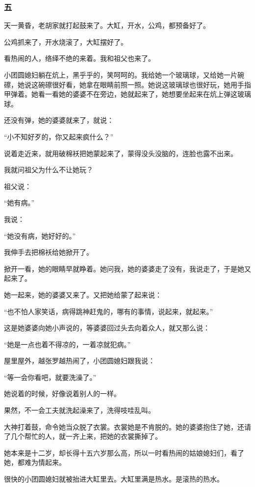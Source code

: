 \subsubsection*{五}
\par 天一黄昏，老胡家就打起鼓来了。大缸，开水，公鸡，都预备好了。
\par 公鸡抓来了，开水烧滚了，大缸摆好了。
\par 看热闹的人，络绎不绝的来着。我和祖父也来了。
\par 小团圆媳妇躺在炕上，黑乎乎的，笑呵呵的。我给她一个玻璃球，又给她一片碗䃰，她说这碗䃰很好看，她拿在眼睛前照一照。她说这玻璃球也很好玩，她用手指甲弹着。她看一看她的婆婆不在旁边，她就起来了，她想要坐起来在炕上弹这玻璃球。
\par 还没有弹，她的婆婆就来了，就说：
\par “小不知好歹的，你又起来疯什么？”
\par 说着走近来，就用破棉袄把她蒙起来了，蒙得没头没脑的，连脸也露不出来。
\par 我就问祖父为什么不让她玩？
\par 祖父说：
\par “她有病。”
\par 我说：
\par “她没有病，她好好的。”
\par 我伸手去把棉袄给她掀开了。
\par 掀开一看，她的眼睛早就睁着。她问我，她的婆婆走了没有，我说走了，于是她又起来了。
\par 她一起来，她的婆婆又来了。又把她给蒙了起来说：
\par “也不怕人家笑话，病得跳神赶鬼的，哪有的事情，说起来，就起来。”
\par 这是她婆婆向她小声说的，等婆婆回过头去向着众人，就又那么说：
\par “她是一点也着不得凉的，一着凉就犯病。”
\par 屋里屋外，越张罗越热闹了，小团圆媳妇跟我说：
\par “等一会你看吧，就要洗澡了。”
\par 她说着的时候，好像说着别人的一样。
\par 果然，不一会工夫就洗起澡来了，洗得吱哇乱叫。
\par 大神打着鼓，命令她当众脱了衣裳。衣裳她是不肯脱的。她的婆婆抱住了她，还请了几个帮忙的人，就一齐上来，把她的衣裳撕掉了。
\par 她本来是十二岁，却长得十五六岁那么高，所以一时看热闹的姑娘媳妇们，看了她，都难为情起来。
\par 很快的小团圆媳妇就被抬进大缸里去。大缸里满是热水。是滚热的热水。
